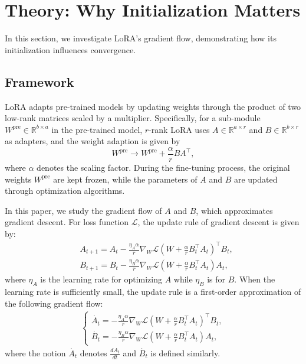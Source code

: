 \section{Theory: Why Initialization Matters}
\label{sec:theory}
In this section, we investigate LoRA's gradient flow, demonstrating how its initialization influences convergence. 

\subsection{Framework}
\label{framework}

LoRA \cite{hu2021lora} adapts pre-trained models by updating weights through the product of two low-rank matrices scaled by a multiplier. Specifically, for a sub-module $W^{\operatorname{pre}}\in \mathbb{R}^{b\times a}$ in the pre-trained model, $r$-rank LoRA uses $A\in\mathbb{R}^{a\times r}$ and $B\in\mathbb{R}^{b\times r}$ as adapters, and the weight adaption is given by 
$$W^{\operatorname{pre}}\to W^{\operatorname{pre}} + \frac{\alpha}{r} BA^\top,$$ 
where $\alpha$ denotes the scaling factor. During the fine-tuning process, the original weights $W^{\operatorname{pre}}$ are kept frozen, while the parameters of $A$ and $B$ are updated through optimization algorithms. 

In this paper, we study the gradient flow of $A$ and $B$, which approximates gradient descent. For loss function $\mathcal{L}$, the update rule of gradient descent is given by:
\begin{align*}
    &A_{t+1}=A_t-\frac{\eta_A\alpha}{r} \nabla_W\mathcal{L}(W+\frac{\alpha}{r}B_t^\top A_t)^\top B_t,\\
    &B_{t+1}=B_t-\frac{\eta_B\alpha}{r} \nabla_W\mathcal{L}(W+\frac{\alpha}{r}B_t^\top A_t) A_t,
\end{align*}
where $\eta_A$ is the learning rate for optimizing $A$ while $\eta_B$ is for $B$. When the learning rate is sufficiently small, the update rule is a first-order approximation of the following gradient flow:
\begin{align}
    \begin{cases}
        \dot{A_t}=-\frac{\eta_A\alpha}{r} \nabla_W\mathcal{L}(W+\frac{\alpha}{r}B_t^\top A_t)^\top B_t,\\
        \dot{B_t}=-\frac{\eta_B\alpha}{r} \nabla_W\mathcal{L}(W+\frac{\alpha}{r}B_t^\top A_t) A_t,
    \end{cases}
    \label{abflow}
\end{align}
where the notion $\dot{A_t}$ denotes $\frac{dA_t}{dt}$ and $\dot{B_t}$ is defined similarly. 


